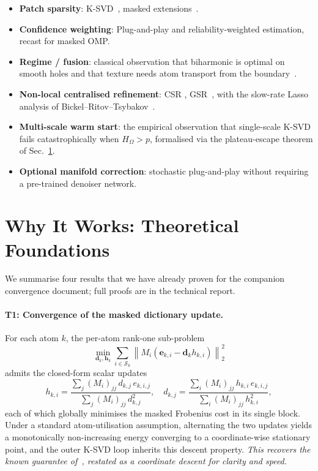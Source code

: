 \documentclass[11pt,a4paper]{article}
\theoremstyle{definition}
\theoremstyle{remark}
\newcommand{\norm}[1]{\left\lVert #1 \right\rVert}
\newcommand{\dvec}{\bm{d}}
\newcommand{\hvec}{\bm{h}}
\newcommand{\Sk}{\mathcal{S}_k}
\begin{document}
\begin{itemize}[leftmargin=*,itemsep=2pt]
\item \textbf{Patch sparsity}: K-SVD~\cite{aharon2006ksvd}, masked
extensions~\cite{mairal2008sparse,naumova2018itkrmm,tiefenthaler2018thesis}.
\item \textbf{Confidence weighting}: Plug-and-play and reliability-weighted
estimation, recast for masked OMP.
\item \textbf{Regime / fusion}: classical observation that biharmonic is
optimal on smooth holes \cite{chan2002mathematical} and that texture
needs atom transport from the boundary~\cite{bertalmio2000image}.
\item \textbf{Non-local centralised refinement}: CSR
\cite{dong2011centralized}, GSR~\cite{zhang2014groupbased}, with the
slow-rate Lasso analysis of
Bickel--Ritov--Tsybakov~\cite{bickel2009simultaneous}.
\item \textbf{Multi-scale warm start}: the empirical observation that
single-scale K-SVD fails catastrophically when
$H_\Omega>p$, formalised via the plateau-escape theorem of
Sec.~\ref{sec:why-works}.
\item \textbf{Optional manifold correction}: stochastic plug-and-play
without requiring a pre-trained denoiser network.
\end{itemize}

\section{Why It Works: Theoretical Foundations}
\label{sec:why-works}

We summarise four results that we have already proven for the
companion convergence document; full proofs are in the technical
report.

\paragraph{T1: Convergence of the masked dictionary update.}
For each atom $k$, the per-atom rank-one sub-problem
\[
\min_{\dvec_k,\hvec_k}\sum_{i\in\Sk}\norm{M_i(\bm{e}_{k,i}-\dvec_k h_{k,i})}_2^2
\]
admits the closed-form scalar updates
\[
h_{k,i}=\frac{\sum_j (M_i)_{jj}\,d_{k,j}\,e_{k,i,j}}{\sum_j (M_i)_{jj}\,d_{k,j}^2},
\quad
d_{k,j}=\frac{\sum_i (M_i)_{jj}\,h_{k,i}\,e_{k,i,j}}{\sum_i (M_i)_{jj}\,h_{k,i}^2},
\]
each of which globally minimises the masked Frobenius cost in its
single block. Under a standard atom-utilisation assumption, alternating
the two updates yields a monotonically non-increasing energy converging
to a coordinate-wise stationary point, and the outer K-SVD loop
inherits this descent property. \emph{This recovers the known
guarantee of~\cite{srebro2003weighted}, restated as a coordinate
descent for clarity and speed.}
\end{document}
